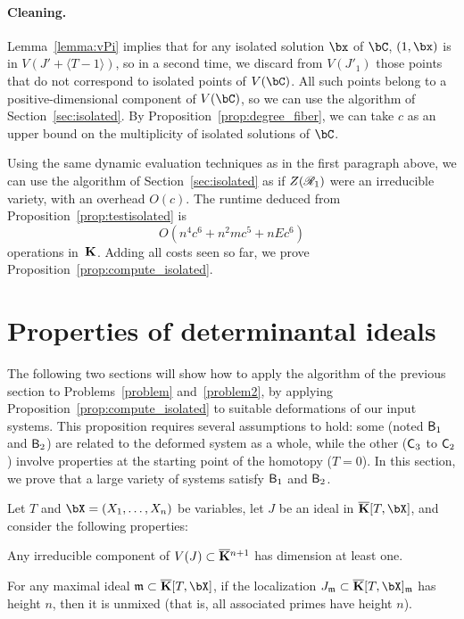 \documentclass[12pt]{article}
\begin{document}
\paragraph{Cleaning.}
Lemma~\ref{lemma:vPi} implies that for any isolated solution $\bx$ of
$\bC$, $(1,\bx)$ is in $V(J' + \langle T-1\rangle)$, so in a second
time, we discard from $V(J'_1)$ those points that do not correspond to
isolated points of $V(\bC)$. All such points belong to a
positive-dimensional component of $V(\bC)$, so we can use the algorithm
of Section~\ref{sec:isolated}. By Proposition~\ref{prop:degree_fiber},
we can take $c$ as an upper bound on the multiplicity of isolated
solutions of $\bC$.

Using the same dynamic evaluation techniques as in the first paragraph
above, we can use the algorithm of Section~\ref{sec:isolated} as if
$Z(\mathscr{R}_1)$ were an irreducible variety, with an overhead 
$O(c)$. The runtime deduced from Proposition~\ref{prop:testisolated} is
$$O(n^4 c^6 + n^2 m c^5 + n E c^6)$$ operations in~$\mathbf{K}$. Adding all
costs seen so far, we prove Proposition~\ref{prop:compute_isolated}.




\section{Properties of determinantal ideals}\label{sec:check}

The following two sections will show how to apply the algorithm of the
previous section to Problems~\ref{problem} and~\ref{problem2}, by
applying Proposition~\ref{prop:compute_isolated} to suitable
deformations of our input systems. This proposition requires several
assumptions to hold: some (noted $\mathsf{B}_1$ and $\mathsf{B}_2$) are related
to the deformed system as a whole, while the other ($\mathsf{C}_3$ to
$\mathsf{C}_2$) involve properties at the starting point of the homotopy
($T=0$). In this section, we prove that a large variety of systems
satisfy $\mathsf{B}_1$ and $\mathsf{B}_2$.

Let $T$ and $\bX=(X_1,\dots,X_n)$ be variables, let $J$ be an ideal in
$\KKbar[T,\bX]$, and consider the following properties:
\begin{description}[leftmargin=*]
\item[$\assA_1.$] Any irreducible component of $V(J) \subset
  \overline{\mathbf{K}}{}^{n+1}$ has dimension at least one.
\item[$\assA_2.$] For any maximal ideal $\m \subset\KKbar[T,\bX]$,
  if the localization $J_\m \subset \KKbar[T,\bX]_\m$ has height $n$,
  then it is unmixed (that is, all associated primes have height $n$).
\end{description}
\end{document}
